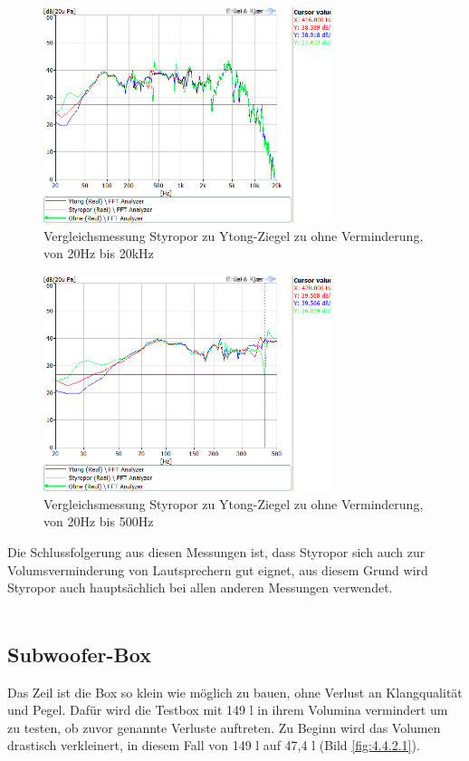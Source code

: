 \begin{figure} [H]
	\centering
	\includegraphics[width=0.75\textwidth]{img/Optimierung/Vergleich/VergleichYtognStyroOhne_full.png}
	\caption{Vergleichsmessung Styropor zu Ytong-Ziegel zu ohne Verminderung, von 20Hz bis 20kHz}
	\label{fig:4.4.1.5}
\end{figure}\begin{figure} [H]
	\centering
	\includegraphics[width=0.75\textwidth]{img/Optimierung/Vergleich/VergleichYtognStyroOhne_500Hz.png}
	\caption{Vergleichsmessung Styropor zu Ytong-Ziegel zu ohne Verminderung, von 20Hz bis 500Hz}
	\label{fig:4.4.1.6}
\end{figure}

Die Schlussfolgerung aus diesen Messungen ist, dass Styropor sich auch zur Volumsverminderung von Lautsprechern gut eignet, aus diesem Grund wird Styropor auch hauptsächlich bei allen anderen Messungen verwendet.\\ \\

\subsection{Subwoofer-Box}\label{subsec:4.4.2}
Das Zeil ist die Box so klein wie möglich zu bauen, ohne Verlust an Klangqualität und Pegel.
Dafür wird die Testbox mit 149 l in ihrem Volumina vermindert um zu testen, ob zuvor genannte Verluste auftreten.
Zu Beginn wird das Volumen drastisch verkleinert, in diesem Fall von 149 l auf 47,4 l (Bild \ref{fig:4.4.2.1}).

